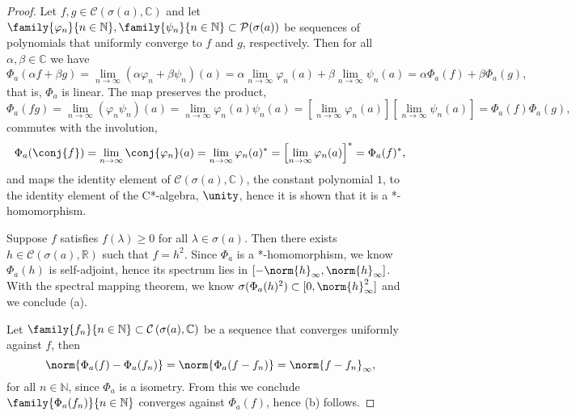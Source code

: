 \begin{proof}
    Let \(f, g \in \mathcal{C}\left(\sigma(a), \mathbb{C}\right)\) and let \(\family{\varphi_n}{n \in \mathbb{N}}, \family{\psi_n}{n \in \mathbb{N}} \subset \mathcal{P}(\sigma(a))\) be sequences of polynomials that uniformly converge to \(f\) and \(g\), respectively. Then for all \(\alpha, \beta \in \mathbb{C}\) we have
    \begin{equation*}
        \Phi_a( \alpha f + \beta g) = \lim_{n \to \infty}{(\alpha \varphi_n + \beta \psi_n)(a)}= \alpha \lim_{n\to\infty}{\varphi_n(a)} + \beta\lim_{n\to\infty}{\psi_n(a)} = \alpha \Phi_a(f) + \beta\Phi_a(g),
    \end{equation*}
    that is, \(\Phi_a\) is linear. The map preserves the product,
    \begin{equation*}
        \Phi_a(fg) = \lim_{n\to\infty}{(\varphi_n\psi_n)(a)} = \lim_{n\to\infty}{\varphi_n(a)\psi_n(a)}=\left[\lim_{n\to\infty}{\varphi_n(a)}\right]\left[\lim_{n\to\infty}{\psi_n(a)}\right] = \Phi_a(f)\Phi_a(g),
    \end{equation*}
    commutes with the involution,
    \begin{equation*}
        \Phi_a(\conj{f}) = \lim_{n\to\infty}{\conj{\varphi_n}(a)} = \lim_{n\to\infty}{\varphi_n(a)^*} = \left[\lim_{n\to\infty}{\varphi_n(a)}\right]^* = \Phi_a(f)^*,
    \end{equation*}
    and maps the identity element of \(\mathcal{C}(\sigma(a), \mathbb{C})\), the constant polynomial \(1\), to the identity element of the C*-algebra, \(\unity\), hence it is shown that it is a *-homomorphism.

    Suppose \(f\) satisfies \(f(\lambda) \geq 0\) for all \(\lambda \in \sigma(a)\). Then there exists \(h \in \mathcal{C}(\sigma(a), \mathbb{R})\) such that \(f = h^2\). Since \(\Phi_a\) is a *-homomorphism, we know \(\Phi_a(h)\) is self-adjoint, hence its spectrum lies in \([-\norm{h}_\infty, \norm{h}_\infty]\). With the spectral mapping theorem, we know \(\sigma(\Phi_a(h)^2) \subset [0, \norm{h}_\infty^2]\) and we conclude (a).

    Let \(\family{f_n}{n \in \mathbb{N}} \subset \mathcal{C}\left(\sigma(a), \mathbb{C}\right)\) be a sequence that converges uniformly against \(f\), then
    \begin{equation*}
        \norm{\Phi_a(f) - \Phi_a(f_n)}= \norm{\Phi_a(f - f_n)} = \norm{f - f_n}_{\infty},
    \end{equation*}
    for all \(n \in \mathbb{N}\), since \(\Phi_a\) is a isometry. From this we conclude \(\family{\Phi_a(f_n)}{n\in \mathbb{N}}\) converges against \(\Phi_a(f)\), hence (b) follows.


\end{proof}
